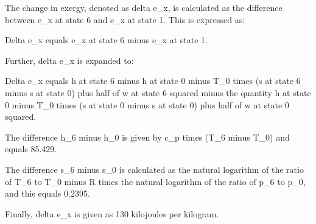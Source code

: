 The change in exergy, denoted as delta e_x, is calculated as the difference between e_x at state 6 and e_x at state 1. This is expressed as:

Delta e_x equals e_x at state 6 minus e_x at state 1.

Further, delta e_x is expanded to:

Delta e_x equals h at state 6 minus h at state 0 minus T_0 times (s at state 6 minus s at state 0) plus half of w at state 6 squared minus the quantity h at state 0 minus T_0 times (s at state 0 minus s at state 0) plus half of w at state 0 squared.

The difference h_6 minus h_0 is given by c_p times (T_6 minus T_0) and equals 85.429.

The difference s_6 minus s_0 is calculated as the natural logarithm of the ratio of T_6 to T_0 minus R times the natural logarithm of the ratio of p_6 to p_0, and this equals 0.2395.

Finally, delta e_x is given as 130 kilojoules per kilogram.